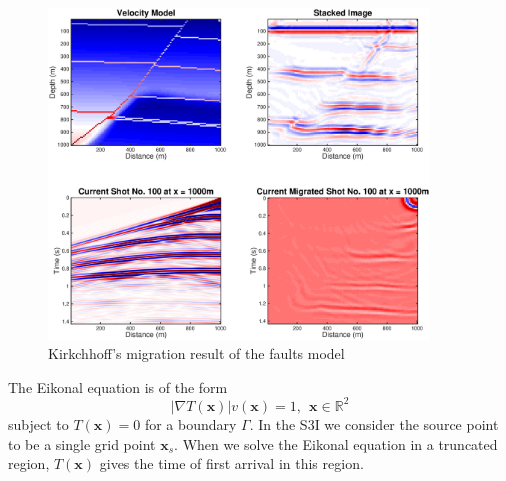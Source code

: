 \documentclass[11pt,titlepage]{article}
\newcommand{\real}{\mathbb{R}}
\newcommand{\bx}{\boldsymbol{x}}
\theoremstyle{plain}
\theoremstyle{definition}
\theoremstyle{remark}
\numberwithin{equation}{section}
\begin{document}
\begin{figure}
\centering
\includegraphics[width=0.9\textwidth]{Fig/kirc.eps}
\caption{Kirkchhoff's migration result of the faults model}
\label{fig:kirc}
\end{figure}

The Eikonal equation is of the form
\begin{equation}
|\nabla T(\bx)| v(\bx)= 1, ~~\bx\in \real^2
\end{equation}
subject to $T(\bx) = 0$ for a boundary $\Gamma$. In the S3I we consider the source point to be a single grid point $\bx_s$. When we solve the Eikonal equation in a truncated region, $T(\bx)$ gives the time of first arrival in this region. 
\end{document}
